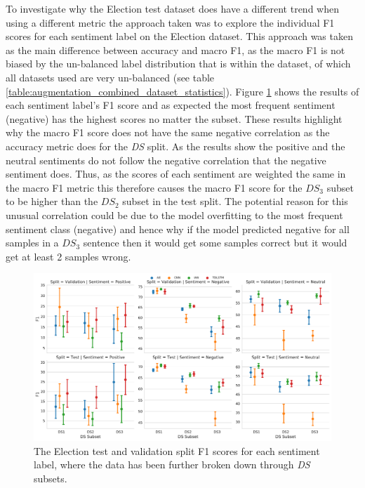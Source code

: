 To investigate why the Election test dataset does have a different trend when using a different metric the approach taken was to explore the individual F1 scores for each sentiment label on the Election dataset. This approach was taken as the main difference between accuracy and macro F1, as the macro F1 is not biased by the un-balanced label distribution that is within the dataset, of which all datasets used are very un-balanced (see table \ref{table:augmentation_combined_dataset_statistics}). Figure \ref{fig:aug_baseline_sentiment_f1_ds_election} shows the results of each sentiment label's F1 score and as expected the most frequent sentiment (negative) has the highest scores no matter the subset. These results highlight why the macro F1 score does not have the same negative correlation as the accuracy metric does for the \textit{DS} split. As the results show the positive and the neutral sentiments do not follow the negative correlation that the negative sentiment does. Thus, as the scores of each sentiment are weighted the same in the macro F1 metric this therefore causes the macro F1 score for the $DS_3$ subset to be higher than the $DS_2$ subset in the test split. The potential reason for this unusual correlation could be due to the model overfitting to the most frequent sentiment class (negative) and hence why if the model predicted negative for all samples in a $DS_3$ sentence then it would get some samples correct but it would get at least 2 samples wrong.

\begin{figure}[h!]
    \centering
    \includegraphics[scale=0.38]{images/augmentation/methods_performance/baseline/sentiment_f1_ds_election.pdf}
    \caption{The Election test and validation split F1 scores for each sentiment label, where the data has been further broken down through \textit{DS} subsets.}
    \label{fig:aug_baseline_sentiment_f1_ds_election}
\end{figure}

